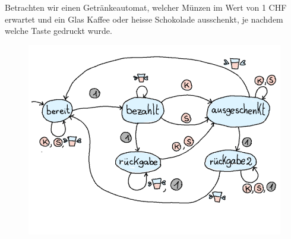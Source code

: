 %
%
Betrachten wir einen Getränkeautomat, welcher Münzen im Wert von 1 CHF erwartet und ein Glas Kaffee oder heisse Schokolade ausschenkt, je nachdem welche Taste gedruckt wurde.
\begin{figure}[H]
\centering
\includegraphics[width=0.6\linewidth]{Pictures/Getraenkeautomat.png}
\end{figure}
